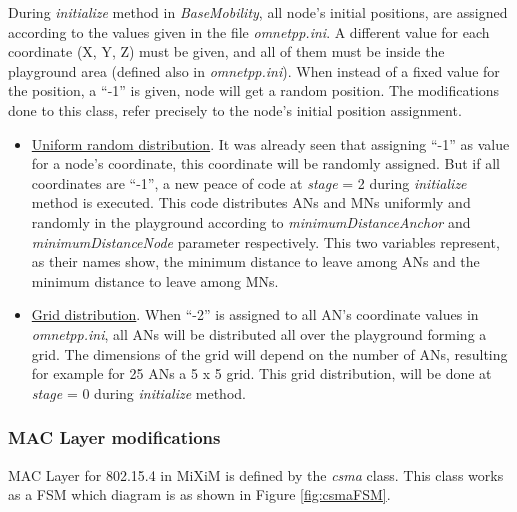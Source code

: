 During \textit{initialize} method in \textit{BaseMobility}, all node's initial positions, are assigned according to the values given in the file
\textit{omnetpp.ini}. A different value for each coordinate (X, Y, Z) must be given, and all of them must be inside the playground area (defined also
in \textit{omnetpp.ini}). When instead of a fixed value for the position, a ``-1'' is given, node will get a random position. The modifications done to
this class, refer precisely to the node's initial position assignment.

\begin{itemize}
 \item \underline{Uniform random distribution}. It was already seen that assigning ``-1'' as value for a node's coordinate, this coordinate will be 
randomly assigned. But if all coordinates are ``-1'', a new peace of code at \textit{stage} = 2 during \textit{initialize} method is executed. This 
code distributes \acp{AN} and \acp{MN} uniformly and randomly in the playground according to \textit{minimumDistanceAnchor} and 
\textit{minimumDistanceNode} parameter respectively. This two variables represent, as their names show, the minimum distance to leave among \acp{AN} 
and the minimum distance to leave among \acp{MN}.
 \item \underline{Grid distribution}. When ``-2'' is assigned to all \ac{AN}'s coordinate values in \textit{omnetpp.ini}, all \acp{AN} will be 
distributed all over the playground forming a grid. The dimensions of the grid will depend on the number of \acp{AN}, resulting for example for 25 
\acp{AN} a 5 x 5 grid. This grid distribution, will be done at \textit{stage} = 0 during \textit{initialize} method.
\end{itemize}

\subsubsection{\ac{MAC} Layer modifications}

\ac{MAC} Layer for 802.15.4 in \ac{MiXiM} is defined by the \textit{csma} class. This class works as a \ac{FSM} which diagram is as shown in Figure 
\ref{fig:csmaFSM}.

